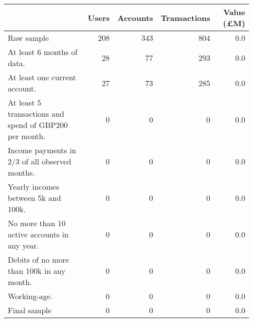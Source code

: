 \begin{tabular}{lrrrr}
\toprule
                                                        & Users & Accounts & Transactions & Value (\pounds M) \\
\midrule
                                             Raw sample &   208 &      343 &          804 &               0.0 \\
                             At least 6 months of data. &    28 &       77 &          293 &               0.0 \\
                          At least one current account. &    27 &       73 &          285 &               0.0 \\
 At least 5 transactions and spend of GBP200 per month. &     0 &        0 &            0 &               0.0 \\
         Income payments in 2/3 of all observed months. &     0 &        0 &            0 &               0.0 \\
                    Yearly incomes between 5k and 100k. &     0 &        0 &            0 &               0.0 \\
           No more than 10 active accounts in any year. &     0 &        0 &            0 &               0.0 \\
              Debits of no more than 100k in any month. &     0 &        0 &            0 &               0.0 \\
                                           Working-age. &     0 &        0 &            0 &               0.0 \\
                                           Final sample &     0 &        0 &            0 &               0.0 \\
\bottomrule
\end{tabular}
